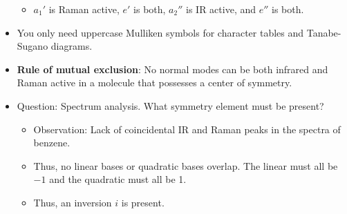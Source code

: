 \documentclass[../notes.tex]{subfiles}
\begin{document}
\begin{itemize}
\begin{itemize}
        \item $a_1'$ is Raman active, $e'$ is both, $a_2''$ is IR active, and $e''$ is both.
    \end{itemize}
    \item You only need uppercase Mulliken symbols for character tables and Tanabe-Sugano diagrams.
    \item \textbf{Rule of mutual exclusion}: No normal modes can be both infrared and Raman active in a molecule that possesses a center of symmetry.
    \item Question: Spectrum analysis. What symmetry element must be present?
    \begin{itemize}
        \item Observation: Lack of coincidental IR and Raman peaks in the spectra of benzene.
        \item Thus, no linear bases or quadratic bases overlap. The linear must all be $-1$ and the quadratic must all be 1.
        \item Thus, an inversion $i$ is present.
    \end{itemize}
\end{itemize}
\end{document}
